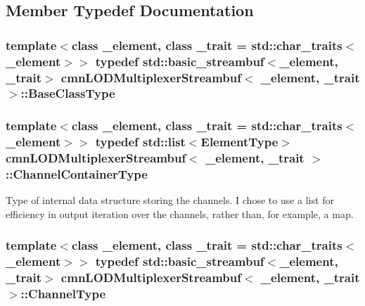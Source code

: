 \subsection{Member Typedef Documentation}
\hypertarget{classcmn_l_o_d_multiplexer_streambuf_acd1cdcc6f9f1607317e5ec459b67da37}{
\subsubsection[{Base\-Class\-Type}]{\setlength{\rightskip}{0pt plus 5cm}template$<$class \-\_\-element, class \-\_\-trait = std\-::char\-\_\-traits$<$\-\_\-element$>$$>$ typedef std\-::basic\-\_\-streambuf$<$\-\_\-element, \-\_\-trait$>$ {\bf cmn\-L\-O\-D\-Multiplexer\-Streambuf}$<$ \-\_\-element, \-\_\-trait $>$\-::{\bf Base\-Class\-Type}}}\label{classcmn_l_o_d_multiplexer_streambuf_acd1cdcc6f9f1607317e5ec459b67da37}
\hypertarget{classcmn_l_o_d_multiplexer_streambuf_a2fd9fe59de3be9b8cf5546ac2b0e41bb}{
\subsubsection[{Channel\-Container\-Type}]{\setlength{\rightskip}{0pt plus 5cm}template$<$class \-\_\-element, class \-\_\-trait = std\-::char\-\_\-traits$<$\-\_\-element$>$$>$ typedef std\-::list$<${\bf Element\-Type}$>$ {\bf cmn\-L\-O\-D\-Multiplexer\-Streambuf}$<$ \-\_\-element, \-\_\-trait $>$\-::{\bf Channel\-Container\-Type}}}\label{classcmn_l_o_d_multiplexer_streambuf_a2fd9fe59de3be9b8cf5546ac2b0e41bb}
Type of internal data structure storing the channels. I chose to use a list for efficiency in output iteration over the channels, rather than, for example, a map. \hypertarget{classcmn_l_o_d_multiplexer_streambuf_aa3b0347701c1aa5157a719978a1a6386}{
\subsubsection[{Channel\-Type}]{\setlength{\rightskip}{0pt plus 5cm}template$<$class \-\_\-element, class \-\_\-trait = std\-::char\-\_\-traits$<$\-\_\-element$>$$>$ typedef std\-::basic\-\_\-streambuf$<$\-\_\-element, \-\_\-trait$>$ {\bf cmn\-L\-O\-D\-Multiplexer\-Streambuf}$<$ \-\_\-element, \-\_\-trait $>$\-::{\bf Channel\-Type}}}\label{classcmn_l_o_d_multiplexer_streambuf_aa3b0347701c1aa5157a719978a1a6386}
